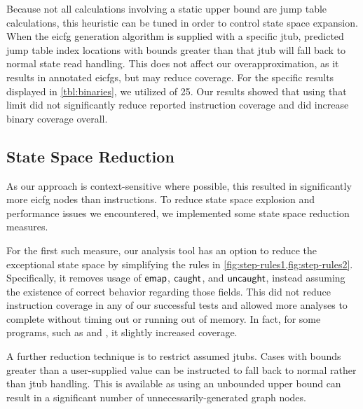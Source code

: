 Because not all calculations involving a static upper bound are jump table calculations, this heuristic can be tuned in order to control state space expansion.
When the \ac{eicfg} generation algorithm is supplied with a specific \ac{jtub}, predicted jump table index locations with bounds greater than that \ac{jtub} will fall back to normal state read handling.
This does not affect our overapproximation, as it results in annotated \acp{eicfg}, but may reduce coverage.
For the specific results displayed in \cref{tbl:binaries}, we utilized  of 25.
Our results showed that using that limit did not significantly reduce reported instruction coverage and did increase binary coverage overall.

\subsection{State Space Reduction}
As our approach is context-sensitive where possible, this resulted in significantly more \ac{eicfg} nodes than instructions.
To reduce state space explosion and performance issues we encountered, we implemented some state space reduction measures.

For the first such measure, our analysis tool has an option to reduce the exceptional state space by simplifying the rules in \cref{fig:step-rules1,fig:step-rules2}.
Specifically, it removes usage of $\operatorname{\mathsf{emap}}$, $\mathsf{caught}$, and $\mathsf{uncaught}$, instead assuming the existence of correct behavior regarding those fields.
This did not reduce instruction coverage in any of our successful tests and allowed more analyses to complete without timing out or running out of memory.
In fact, for some programs, such as  and , it slightly increased coverage.

A further reduction technique is to restrict assumed \acp{jtub}.
Cases with bounds greater than a user-supplied value can be instructed to fall back to normal rather than \ac{jtub} handling.
This is available as using an unbounded upper bound can result in a significant number of unnecessarily-generated graph nodes.

